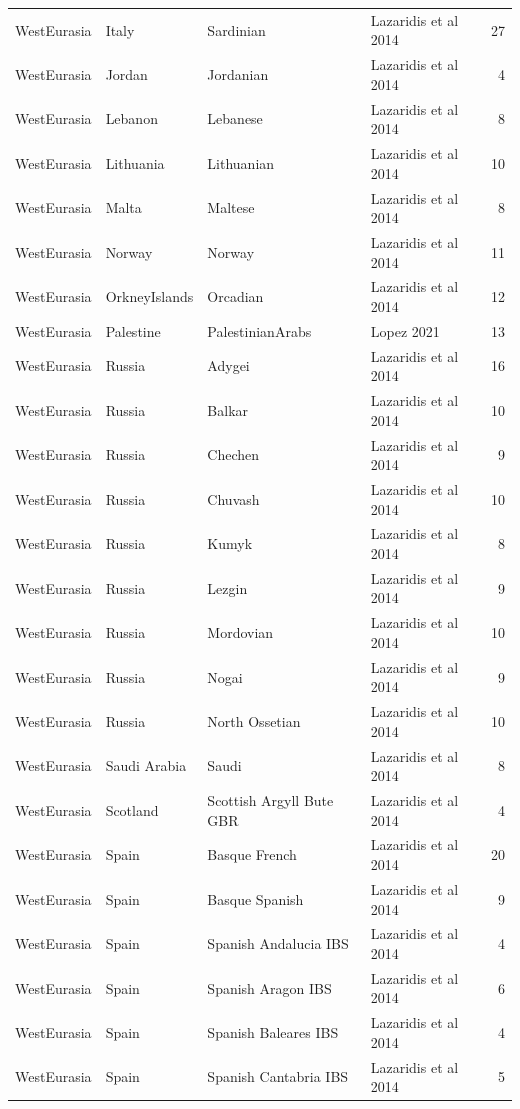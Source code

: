 \begin{longtable}[t]{lll>{\raggedright\arraybackslash}p{9em}r}
\addlinespace
WestEurasia & Italy & Sardinian & Lazaridis et al 2014 & 27\\
WestEurasia & Jordan & Jordanian & Lazaridis et al 2014 & 4\\
WestEurasia & Lebanon & Lebanese & Lazaridis et al 2014 & 8\\
WestEurasia & Lithuania & Lithuanian & Lazaridis et al 2014 & 10\\
WestEurasia & Malta & Maltese & Lazaridis et al 2014 & 8\\
\addlinespace
WestEurasia & Norway & Norway & Lazaridis et al 2014 & 11\\
WestEurasia & OrkneyIslands & Orcadian & Lazaridis et al 2014 & 12\\
WestEurasia & Palestine & PalestinianArabs & Lopez 2021 & 13\\
WestEurasia & Russia & Adygei & Lazaridis et al 2014 & 16\\
WestEurasia & Russia & Balkar & Lazaridis et al 2014 & 10\\
\addlinespace
WestEurasia & Russia & Chechen & Lazaridis et al 2014 & 9\\
WestEurasia & Russia & Chuvash & Lazaridis et al 2014 & 10\\
WestEurasia & Russia & Kumyk & Lazaridis et al 2014 & 8\\
WestEurasia & Russia & Lezgin & Lazaridis et al 2014 & 9\\
WestEurasia & Russia & Mordovian & Lazaridis et al 2014 & 10\\
\addlinespace
WestEurasia & Russia & Nogai & Lazaridis et al 2014 & 9\\
WestEurasia & Russia & North Ossetian & Lazaridis et al 2014 & 10\\
WestEurasia & Saudi Arabia & Saudi & Lazaridis et al 2014 & 8\\
WestEurasia & Scotland & Scottish Argyll Bute GBR & Lazaridis et al 2014 & 4\\
WestEurasia & Spain & Basque French & Lazaridis et al 2014 & 20\\
\addlinespace
WestEurasia & Spain & Basque Spanish & Lazaridis et al 2014 & 9\\
WestEurasia & Spain & Spanish Andalucia IBS & Lazaridis et al 2014 & 4\\
WestEurasia & Spain & Spanish Aragon IBS & Lazaridis et al 2014 & 6\\
WestEurasia & Spain & Spanish Baleares IBS & Lazaridis et al 2014 & 4\\
WestEurasia & Spain & Spanish Cantabria IBS & Lazaridis et al 2014 & 5\\

\end{longtable}

